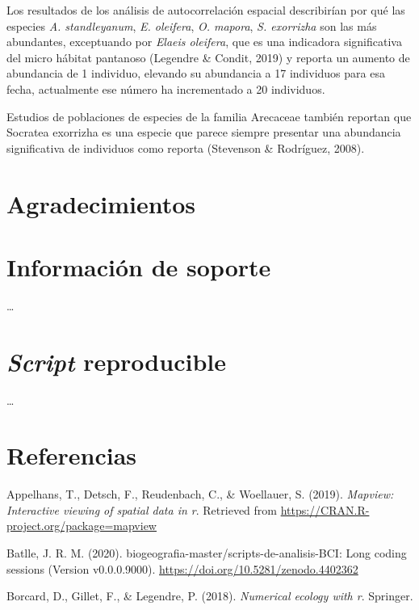 \documentclass[11pt,]{article}
\begin{document}
Los resultados de los análisis de autocorrelación espacial describirían
por qué las especies \emph{A. standleyanum}, \emph{E. oleifera},
\emph{O. mapora}, \emph{S. exorrizha} son las más abundantes,
exceptuando por \emph{Elaeis oleifera}, que es una indicadora
significativa del micro hábitat pantanoso (Legendre \& Condit, 2019) y
reporta un aumento de abundancia de 1 individuo, elevando su abundancia
a 17 individuos para esa fecha, actualmente ese número ha incrementado a
20 individuos.

Estudios de poblaciones de especies de la familia Arecaceae también
reportan que Socratea exorrizha es una especie que parece siempre
presentar una abundancia significativa de individuos como reporta
(Stevenson \& Rodríguez, 2008).

\section{Agradecimientos}\label{agradecimientos}

\section{Información de soporte}\label{informaciuxf3n-de-soporte}

\ldots

\section{\texorpdfstring{\emph{Script}
reproducible}{Script reproducible}}\label{script-reproducible}

\ldots

\section*{Referencias}\label{referencias}

\hypertarget{refs}{}
\hypertarget{ref-MapView}{}
Appelhans, T., Detsch, F., Reudenbach, C., \& Woellauer, S. (2019).
\emph{Mapview: Interactive viewing of spatial data in r}. Retrieved from
\url{https://CRAN.R-project.org/package=mapview}

\hypertarget{ref-jose_ramon_martinez_batlle_2020_4402362}{}
Batlle, J. R. M. (2020). biogeografia-master/scripts-de-analisis-BCI:
Long coding sessions (Version v0.0.0.9000).
\url{https://doi.org/10.5281/zenodo.4402362}

\hypertarget{ref-borcard2018numerical}{}
Borcard, D., Gillet, F., \& Legendre, P. (2018). \emph{Numerical ecology
with r}. Springer.
\end{document}
